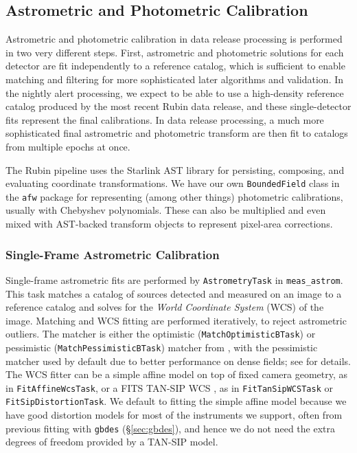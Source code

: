 \subsection{Astrometric and Photometric Calibration}
\label{sec:calibration}

Astrometric and photometric calibration in data release processing is performed in two very different steps.
First, astrometric and photometric solutions for each detector are fit independently to a reference catalog, which is sufficient to enable matching and filtering for more sophisticated later algorithms and validation.
In the nightly alert processing, we expect to be able to use a high-density reference catalog produced by the most recent Rubin data release, and these single-detector fits represent the final calibrations.
In data release processing, a much more sophisticated final astrometric and photometric transform are then fit to catalogs from multiple epochs at once.

The Rubin pipeline uses the Starlink AST library \citep{2016A&C....15...33B} for persisting, composing, and evaluating coordinate transformations.
We have our own \texttt{BoundedField} class in the \texttt{afw} package for representing (among other things) photometric calibrations, usually with Chebyshev polynomials.
These can also be multiplied and even mixed with AST-backed transform objects to represent pixel-area corrections.

\subsubsection{Single-Frame Astrometric Calibration}
\label{sec:astrometryTask}

Single-frame astrometric fits are performed by \texttt{AstrometryTask} in \texttt{meas\_astrom}.
This task matches a catalog of sources detected and measured on an image to a reference catalog and solves for the \textit{World Coordinate System} (WCS) of the image.
Matching and WCS fitting are performed iteratively, to reject astrometric outliers.
The matcher is either the optimistic (\texttt{MatchOptimisticBTask}) or pessimistic (\texttt{MatchPessimisticBTask}) matcher from \citet{2007PASA...24..189T}, with the pessimistic matcher used by default due to better performance on dense fields; see \citep{DMTN-031} for details.
The WCS fitter can be a simple affine model on top of fixed camera geometry, as in \texttt{FitAffineWcsTask}, or a FITS TAN-SIP WCS \citep{2005ASPC..347..491S}, as in \texttt{FitTanSipWCSTask} or \texttt{FitSipDistortionTask}.
We default to fitting the simple affine model because we have good distortion models for most of the instruments we support, often from previous fitting with \texttt{gbdes} (\S\ref{sec:gbdes}), and hence we do not need the extra degrees of freedom provided by a TAN-SIP model.

